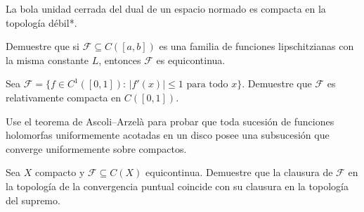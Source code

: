 \begin{theorem}
\label{teo:banach-alaoglu}
La bola unidad cerrada del dual de un espacio normado es compacta en la topología débil*.
\end{theorem}

\begin{exercise}
Demuestre que si $\mathcal{F}\subseteq C([a,b])$ es una familia de funciones lipschitzianas con la misma constante $L$, entonces $\mathcal{F}$ es equicontinua.
\end{exercise}

\begin{exercise}
Sea $\mathcal{F}=\{f\in C^1([0,1]):\,|f'(x)|\leq 1\text{ para todo }x\}$. Demuestre que $\mathcal{F}$ es relativamente compacta en $C([0,1])$.
\end{exercise}

\begin{exercise}
Use el teorema de Ascoli--Arzelà para probar que toda sucesión de funciones holomorfas uniformemente acotadas en un disco posee una subsucesión que converge uniformemente sobre compactos.
\end{exercise}

\begin{problem}
Sea $X$ compacto y $\mathcal{F}\subseteq C(X)$ equicontinua. Demuestre que la clausura de $\mathcal{F}$ en la topología de la convergencia puntual coincide con su clausura en la topología del supremo.
\end{problem}
